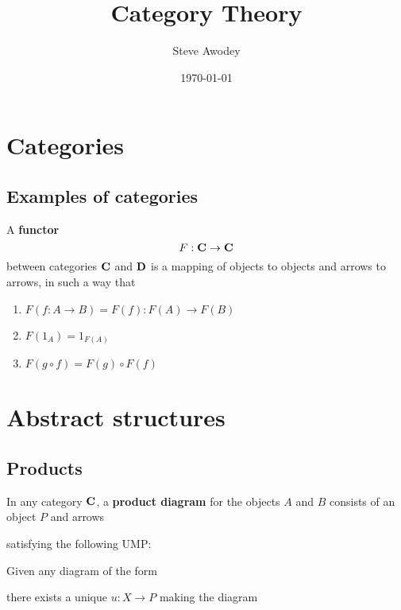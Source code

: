 \documentclass[11pt]{article}
\author{Steve Awodey}
\date{\today}
\title{Category Theory}
\begin{document}
\maketitle
\tableofcontents

\section{Categories}
\label{sec:org2bda97a}
\subsection{Examples of categories}
\label{sec:org2f4964e}
\begin{definition}[]
A \textbf{functor}
\begin{equation*}
F:\operatorname{\textbf{C}}\to\operatorname{\textbf{C}}
\end{equation*}
between categories \(\operatorname{\textbf{C}}\) and \(\operatorname{\textbf{D}}\) is a mapping of objects to objects and
arrows to arrows, in such a way that
\begin{enumerate}
\item \(F(f:A\to B)=F(f):F(A)\to F(B)\)
\item \(F(1_A)=1_{F(A)}\)
\item \(F(g\circ f)=F(g)\circ F(f)\)
\end{enumerate}
\end{definition}

\section{Abstract structures}
\label{sec:orgf7f8f71}

\subsection{Products}
\label{sec:org6545874}
\begin{definition}[]
In any category \(\operatorname{\textbf{C}}\), a \textbf{product diagram} for the objects \(A\) and \(B\)
consists of an object \(P\) and arrows
\begin{center}\end{center}

satisfying the following UMP:

Given any diagram of the form
\begin{center}\end{center}

there exists a unique \(u:X\to P\) making the diagram
\begin{center}\end{center}
\end{definition}
\end{document}
